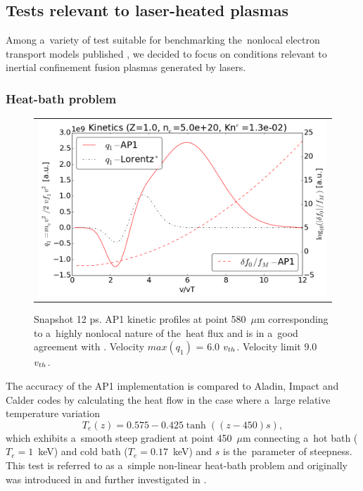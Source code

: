 \subsection{Tests relevant to laser-heated plasmas}
\label{sec:SimulationResults}

Among a~variety of test suitable for benchmarking the~nonlocal electron 
transport models published 
\cite{Epperlein_PoFB1991, marocchino2013, Sorbo_2015, 
Sorbo_2016, Sherlock_PoP2017, Brodrick_PoP2017}, we decided to focus on 
conditions relevant to inertial confinement fusion plasmas generated by lasers.

\subsubsection{Heat-bath problem}  
\label{sec:heatbath_test}
\begin{figure}[tbh]
  \begin{center}
    \begin{tabular}{c}
	  \includegraphics[width=\figscale\textwidth]{../VFPdata/C7_Aladin_case5_nonlocal_kinetics.png}
    \end{tabular}
  \caption{  
  Snapshot 12 ps. AP1 kinetic profiles at point 580~$\mu$m corresponding to 
  a~highly nonlocal nature of the~heat flux  
  and is in a~good agreement with
  \cite{Sherlock_PoP2017}. Velocity $max(q_1)$ = 6.0 $v_{th}$. 
  Velocity limit 9.0 $v_{th}$.
  }
  \label{fig:C7_Aladin_case5_nonlocal}
  \end{center} 
\end{figure}

The accuracy of the AP1 implementation is compared to Aladin, Impact and Calder
codes by calculating the heat flow in the case
where a~large relative temperature variation
\begin{equation}
  T_e(z) = 0.575 - 0.425 \tanh\left((z-450) s\right) ,
  \label{eq:T_init}
\end{equation}
which exhibits a~smooth steep gradient at point 450~$\mu$m 
connecting a~hot bath ($T_e = 1$~keV) 
and cold bath ($T_e = 0.17$~keV) and $s$ is the~parameter of steepness. 
This test is referred to as a~simple non-linear heat-bath problem and
originally was introduced in \cite{marocchino2013} and further investigated
in  \cite{Sorbo_2015, Sorbo_2016, Sherlock_PoP2017, Brodrick_PoP2017}.

